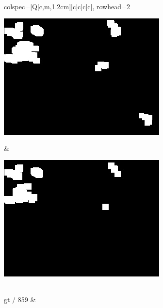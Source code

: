 \begin{longtblr}[
            caption = {Hasil uji coba proses \textit{background subtraction} menggunakan GMM yang disempurnakan oleh Operasi Morfologi},
            label = {tab:gmm_morph_9908}
        ]{
            colspec={|Q[c,m,1.2cm]|c|c|c|c|},
            rowhead=2
        }
\begin{minipage}{0.19\textwidth}
                \includegraphics[width=\linewidth]{image/gt_116/gt_116_dilated_5x11_frame803.jpg}
            \end{minipage} & 
            \begin{minipage}{0.19\textwidth}
                \includegraphics[width=\linewidth]{image/gt_116/gt_116_dilated_7x13_frame803.jpg}
            \end{minipage} \\
            \hline
            gt / 859 &
            \begin{minipage}{0.19\textwidth}

\end{minipage}
\end{longtblr}
